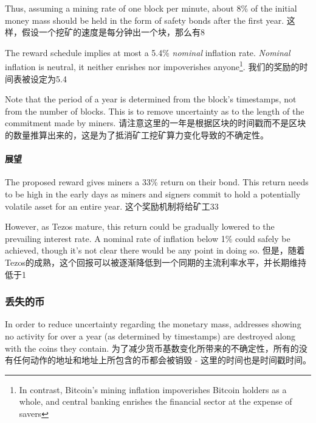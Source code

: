 \documentclass[letterpaper]{article}
\begin{document}
Thus, assuming a mining rate of one block per minute, about 8\% of the initial
money mass should be held in the form of safety bonds after the first year.
这样，假设一个挖矿的速度是每分钟出一个块，那么有8%

The reward schedule implies at most a 5.4\% \emph{nominal} inflation
rate. \emph{Nominal} inflation is neutral, it neither enrishes nor
impoverishes anyone\footnote{In contrast, Bitcoin's mining inflation impoverishes
Bitcoin holders as a whole, and central banking enrishes the financial
sector at the expense of savers}.
我们的奖励的时间表被设定为5.4%

Note that the period of a year is determined from the block's timestamps, not
from the number of blocks. This is to remove uncertainty as to the length of
the commitment made by miners. 
请注意这里的一年是根据区块的时间戳而不是区块的数量推算出来的，这是为了抵消矿工挖矿算力变化导致的不确定性。

\paragraph{展望}
The proposed reward gives miners a 33\% return on their bond.
This return needs to be high in the early days as miners and signers commit
to hold a potentially volatile asset for an entire year.
这个奖励机制将给矿工33%

However, as Tezos mature, this return could be gradually lowered to the
prevailing interest rate. A nominal rate of inflation below 1\% could safely be
achieved, though it's not clear there would be any point in doing so.
但是，随着Tezos的成熟，这个回报可以被逐渐降低到一个同期的主流利率水平，并长期维持低于1%

\subsubsection{丢失的币}
In order to reduce uncertainty regarding the monetary mass, addresses
showing no activity for over a year (as determined by timestamps)
are destroyed along with the coins they contain.
为了减少货币基数变化所带来的不确定性，所有的没有任何动作的地址和地址上所包含的币都会被销毁 - 这里的时间也是时间戳时间。
\end{document}
